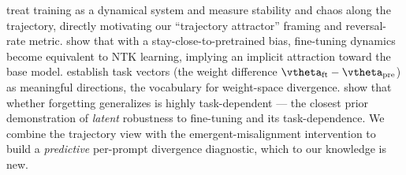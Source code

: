  \citet{danovski2024dynamical} treat training as a dynamical
system and measure stability and chaos along the trajectory, directly motivating our
``trajectory attractor'' framing and reversal-rate metric. \citet{rahimi2026linearization}
show that with a stay-close-to-pretrained bias, fine-tuning dynamics become equivalent to
NTK learning, implying an implicit attraction toward the base model.
\citet{ilharco2022taskarithmetic} establish task vectors (the weight difference
$\vtheta_{\text{ft}}-\vtheta_{\text{pre}}$) as meaningful directions, the vocabulary for
weight-space divergence. \citet{zhang2024unforgettable} show that whether forgetting
generalizes is highly task-dependent --- the closest prior demonstration of \emph{latent}
robustness to fine-tuning and its task-dependence. We combine the trajectory view with the
emergent-misalignment intervention to build a \emph{predictive} per-prompt divergence
diagnostic, which to our knowledge is new.
